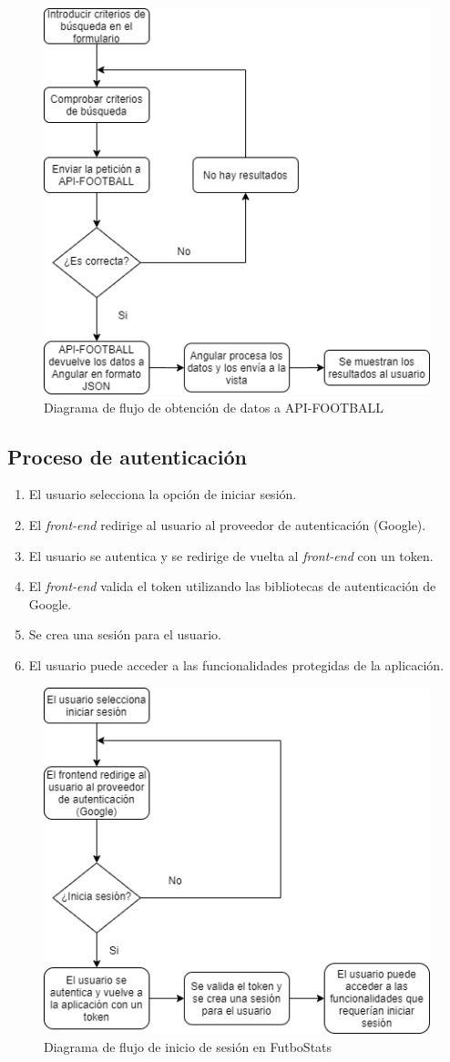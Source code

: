 \begin{figure}[H]
    \centering
    \includegraphics[width=0.7\linewidth]{img/flujo1.png}
    \caption{Diagrama de flujo de obtención de datos a API-FOOTBALL}
    \label{fig:enter-label}
\end{figure}


\subsection{Proceso de autenticación}
\begin{enumerate}
	\item El usuario selecciona la opción de iniciar sesión.
	\item El \textit{front-end} redirige al usuario al proveedor de autenticación (Google).
        \item El usuario se autentica y se redirige de vuelta al \textit{front-end} con un token.
        \item El \textit{front-end} valida el token utilizando las bibliotecas de autenticación de Google.
        \item Se crea una sesión para el usuario.
        \item El usuario puede acceder a las funcionalidades protegidas de la aplicación.
\end{enumerate}

\begin{figure}[H]
    \centering
    \includegraphics[width=0.7\linewidth]{img/flujo2.png}
    \caption{Diagrama de flujo de inicio de sesión en FutboStats}
    \label{fig:enter-label}
\end{figure} 

